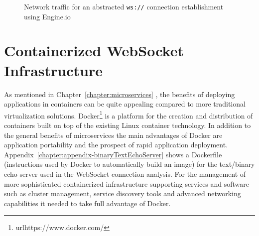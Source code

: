 \newpage
\begin{figure}[h!]
	\centering
	\caption{Network traffic for an abstracted \texttt{ws://} connection establishment using Engine.io}
	\label{fig:engineioTraffic}
\end{figure}

\section{Containerized WebSocket Infrastructure}

As mentioned in Chapter~\ref{chapter:microservices} , the benefits of deploying applications in containers can be quite appealing compared to more traditional virtualization solutions. Docker\footnote{url{https://www.docker.com/}} is a platform for the creation and distribution of containers built on top of the existing Linux container technology. In addition to the general benefits of microservices the main advantages of Docker are application portability and the prospect of rapid application deployment. Appendix~\ref{chapter:appendix-binaryTextEchoServer} shows a Dockerfile (instructions used by Docker to automatically build an image) for the text/binary echo server used in the WebSocket connection analysis. For the management of more sophisticated containerized infrastructure supporting services and software such as cluster management, service discovery tools and advanced networking capabilities it needed to take full advantage of Docker.

